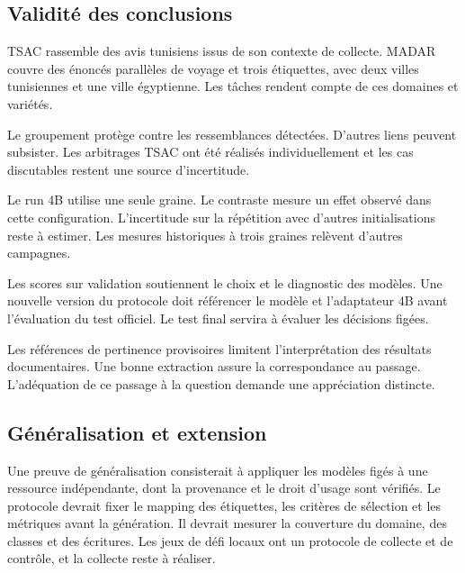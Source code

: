 \subsection{Validité des conclusions}
\begin{description}[style=nextline,leftmargin=0pt,labelsep=0pt,font=\bfseries]
\item[Domaine et couverture.] TSAC rassemble des avis tunisiens issus de son contexte de collecte. MADAR couvre des énoncés parallèles de voyage et trois étiquettes, avec deux villes tunisiennes et une ville égyptienne. Les tâches rendent compte de ces domaines et variétés.
\item[Groupes et annotation.] Le groupement protège contre les ressemblances détectées. D’autres liens peuvent subsister. Les arbitrages TSAC ont été réalisés individuellement et les cas discutables restent une source d’incertitude.
\item[Variabilité.] Le run 4B utilise une seule graine. Le contraste mesure un effet observé dans cette configuration. L’incertitude sur la répétition avec d’autres initialisations reste à estimer. Les mesures historiques à trois graines relèvent d’autres campagnes.
\item[Consultation de la validation.] Les scores sur validation soutiennent le choix et le diagnostic des modèles. Une nouvelle version du protocole doit référencer le modèle et l’adaptateur 4B avant l’évaluation du test officiel. Le test final servira à évaluer les décisions figées.
\item[Documentation bilingue.] Les références de pertinence provisoires limitent l’interprétation des résultats documentaires. Une bonne extraction assure la correspondance au passage. L’adéquation de ce passage à la question demande une appréciation distincte.
\end{description}

\subsection{Généralisation et extension}
Une preuve de généralisation consisterait à appliquer les modèles figés à une ressource indépendante, dont la provenance et le droit d’usage sont vérifiés. Le protocole devrait fixer le mapping des étiquettes, les critères de sélection et les métriques avant la génération. Il devrait mesurer la couverture du domaine, des classes et des écritures. Les jeux de défi locaux ont un protocole de collecte et de contrôle, et la collecte reste à réaliser.

